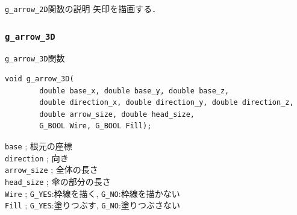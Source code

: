 \documentclass[platex,a4paper,12pt]{jsarticle}%
\begin{document}
\begin{itembox}[l]{\texttt{g\_arrow\_2D}関数の説明}
矢印を描画する．
\end{itembox}

\begin{figure}[htb]
\end{figure}


\clearpage
\subsubsection{\texttt{g\_arrow\_3D}}

\begin{itembox}[l]{\texttt{g\_arrow\_3D}関数}
\begin{verbatim}
void g_arrow_3D(
        double base_x, double base_y, double base_z,
        double direction_x, double direction_y, double direction_z,
        double arrow_size, double head_size,
        G_BOOL Wire, G_BOOL Fill);
\end{verbatim}
\verb|base| ; 根元の座標\\
\verb|direction| ; 向き\\
\verb|arrow_size| ; 全体の長さ\\
\verb|head_size| ; 傘の部分の長さ\\
\verb|Wire| ; \verb|G_YES|:枠線を描く, \verb|G_NO|:枠線を描かない \\
\verb|Fill| ; \verb|G_YES|:塗りつぶす, \verb|G_NO|:塗りつぶさない 
\end{itembox}
\end{document}
